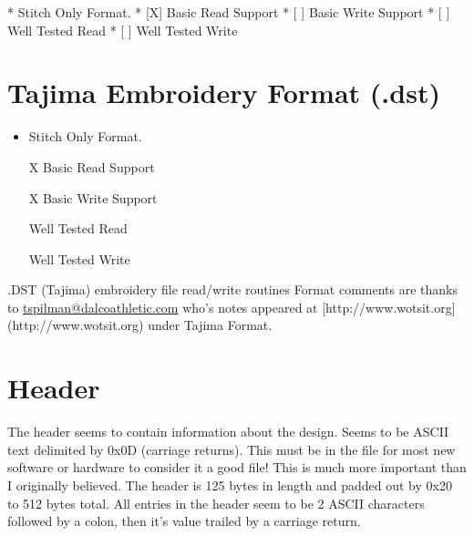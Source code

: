 \documentclass{report}
\begin{document}
* Stitch Only Format.
* [X] Basic Read Support
* [ ] Basic Write Support
* [ ] Well Tested Read
* [ ] Well Tested Write

\section{Tajima Embroidery Format (.dst)}

\begin{itemize}
\item Stitch Only Format.
\item [X] Basic Read Support
\item [X] Basic Write Support
\item [ ] Well Tested Read
\item [ ] Well Tested Write
\end{itemize}

.DST (Tajima) embroidery file read/write routines
Format comments are thanks to \url{tspilman@dalcoathletic.com} who's
notes appeared at [http://www.wotsit.org](http://www.wotsit.org) under Tajima Format.

\section{Header}

The header seems to contain information about the design.
Seems to be ASCII text delimited by 0x0D (carriage returns).
This must be in the file for most new software or hardware
to consider it a good file! This is much more important
than I originally believed. The header is 125 bytes in
length and padded out by 0x20 to 512 bytes total.
All entries in the header seem to be 2 ASCII characters
followed by a colon, then it's value trailed by a carriage return.
\end{document}
